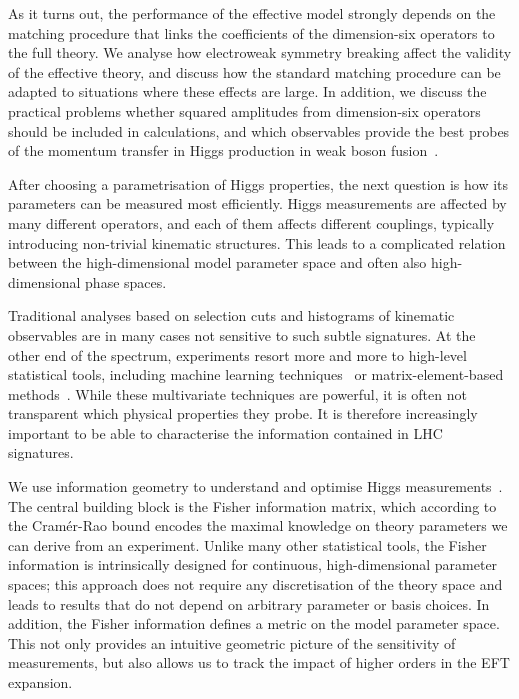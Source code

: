 As it turns out, the performance of the effective model strongly
depends on the matching procedure that links the coefficients of the
dimension-six operators to the full theory. We analyse how electroweak
symmetry breaking affect the validity of the effective theory, and
discuss how the standard matching procedure can be adapted to
situations where these effects are large. In addition, we discuss the
practical problems whether squared amplitudes from dimension-six
operators should be included in calculations, and which observables
provide the best probes of the momentum transfer in Higgs production
in weak boson fusion~\cite{Biekotter:2016ecg}.

\newparagraph
%
After choosing a parametrisation of Higgs properties, the next
question is how its parameters can be measured most efficiently. Higgs
measurements are affected by many different operators, and each of
them affects different couplings, typically introducing non-trivial
kinematic structures. This leads to a complicated relation between the
high-dimensional model parameter space and often also high-dimensional
phase spaces.

Traditional analyses based on selection cuts and histograms of
kinematic observables are in many cases not sensitive to such subtle
signatures.  At the other end of the spectrum, experiments resort more
and more to high-level statistical tools, including machine learning
techniques~\cite{Cranmer:2015bka, Louppe:2016ylz, Louppe:2016aov,
  Cranmer:2016lzt, Baldi:2016fzo, Brehmer:ghost_probability,
  Cogan:2014oua, Baldi:2014pta, deOliveira:2015xxd, Almeida:2015jua,
  Baldi:2016fql, Guest:2016iqz, Komiske:2016rsd, Kasieczka:2017nvn,
  Louppe:2017ipp, Baldi:2014kfa, Searcy:2015apa, Santos:2016kno,
  Alves:2016htj, Buckley:2011kc, Bornhauser:2013aya, Bechtle:2017vyu}
or matrix-element-based methods~\cite{Kondo:1988yd, Abazov:2004cs,
  Gao:2010qx, Alwall:2010cq, Avery:2012um, Andersen:2012kn,
  Campbell:2013hz, Artoisenet:2013vfa, Martini:2015fsa,
  Gritsan:2016hjl, Soper:2011cr, Soper:2012pb, Soper:2014rya,
  Atwood:1991ka, Davier:1992nw, Diehl:1993br}. While these
multivariate techniques are powerful, it is often not transparent
which physical properties they probe. It is therefore increasingly
important to be able to characterise the information contained in LHC
signatures.

We use information geometry to understand and optimise Higgs
measurements~\cite{Brehmer:2016nyr}.  The central building block is
the Fisher information matrix, which according to the Cram\'er-Rao
bound encodes the maximal knowledge on theory parameters we can derive
from an experiment. Unlike many other statistical tools, the Fisher
information is intrinsically designed for continuous, high-dimensional
parameter spaces; this approach does not require any discretisation of
the theory space and leads to results that do not depend on arbitrary
parameter or basis choices. In addition, the Fisher information
defines a metric on the model parameter space. This not only provides
an intuitive geometric picture of the sensitivity of measurements, but
also allows us to track the impact of higher orders in the EFT
expansion.

